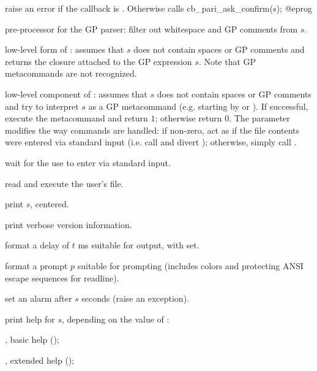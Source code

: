 
 raise an error if the
callback  is . Otherwise
calls
\bprog
  cb_pari_ask_confirm(s);
@eprog

 pre-processor for the GP
parser: filter out whitespace and GP comments from $s$.

 low-level form of
: assumes that $s$ does not contain spaces or GP comments and
returns the closure attached to the GP expression $s$. Note
that GP metacommands are not recognized.

 low-level component of
: assumes that $s$ does not contain spaces or GP comments and
try to interpret $s$ as a GP metacommand (e.g. starting by \kbd{\bs} or
). If successful, execute the metacommand and return $1$; otherwise
return $0$. The  parameter modifies the way  commands
are handled: if non-zero, act as if the file contents were entered via
standard input (i.e. call  and divert );
otherwise, simply call .

 wait for the use to enter 
via standard input.

 read and execute the user's  file.

 print $s$, centered.

 print verbose version information.

 format a delay of $t$ ms
suitable for  output, with  set.

 format a prompt $p$
suitable for  prompting (includes colors and protecting ANSI escape
sequences for readline).

 set an alarm after $s$ seconds (raise an
 exception).

 print help for $s$, depending
on the value of \fl:

\item {}, basic help ();

\item {}, extended help ();

